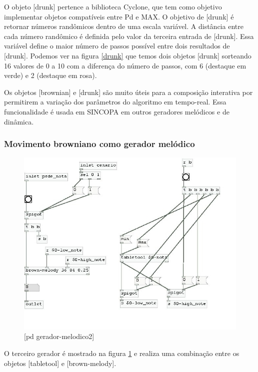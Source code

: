 \documentclass[draft]{ppgmus}
\begin{document}
O objeto [drunk] pertence a biblioteca Cyclone, que tem como objetivo
implementar objetos compatíveis entre Pd e MAX. O objetivo de [drunk] é
retornar números randômicos dentro de uma escala variável. A distância
entre cada número randômico é definida pelo valor da terceira entrada
de [drunk]. Essa variável define o maior número de passos possível entre 
dois resultados de [drunk]. Podemos ver na figura \ref{drunk} que temos
dois objetos [drunk] sorteando 16 valores de 0 a 10 com a diferença do
número de passos, com 6 (destaque em verde) e 2 (destaque em rosa).

Os objetos [brownian] e [drunk] são muito úteis para a composição 
interativa por permitirem a variação dos parâmetros do algoritmo
em tempo-real. Essa funcionalidade é usada em SINCOPA em outros geradores
melódicos e de dinâmica.

\subsubsection{Movimento browniano como gerador melódico}


\begin{figure}
\includegraphics[scale=.6]{gera-melodico2}
\caption{[pd gerador-melodico2]}
\label{gera-melodico2}
\end{figure}  


O terceiro gerador é mostrado na figura \ref{gera-melodico2} e
realiza uma combinação entre os objetos [tabletool] e [brown-melody].
\end{document}
